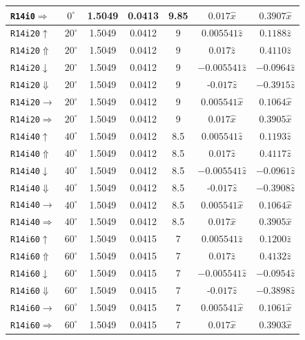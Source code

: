 \begin{longtable}{l|c|c|c|c|c|c}
{\tt R14i0$\Rightarrow$}&$0^\circ$ & 1.5049 & 0.0413 & 9.85 & $0.017\hat{x}$ & $0.3907\hat{x}$ \\
\hline
{\tt R14i20$\uparrow$}&$20^\circ$ & 1.5049 & 0.0412 & 9 & $0.005541\hat{z}$ & $0.1188\hat{z}$ \\
{\tt R14i20$\Uparrow$}&$20^\circ$ & 1.5049 & 0.0412 & 9 & $0.017\hat{z}$ & $0.4110\hat{z}$ \\
{\tt R14i20$\downarrow$}&$20^\circ$ & 1.5049 & 0.0412 & 9 &  $-0.005541\hat{z}$& $-0.0964\hat{z}$\\
{\tt R14i20$\Downarrow$}&$20^\circ$ & 1.5049 & 0.0412 & 9 & -$0.017\hat{z}$ & $-0.3915\hat{z}$ \\
{\tt R14i20$\rightarrow$}&$20^\circ$ & 1.5049 & 0.0412 & 9 & $0.005541\hat{x}$ & $0.1064\hat{x}$\\
{\tt R14i20$\Rightarrow$}&$20^\circ$ & 1.5049 & 0.0412 & 9 & $0.017\hat{x}$ & $0.3905\hat{x}$ \\
\hline
{\tt R14i40$\uparrow$}&$40^\circ$ & 1.5049 & 0.0412 & 8.5 &  $0.005541\hat{z}$ & $0.1193\hat{z}$ \\
{\tt R14i40$\Uparrow$}&$40^\circ$ & 1.5049 & 0.0412 & 8.5 & $0.017\hat{z}$ & $0.4117\hat{z}$ \\
{\tt R14i40$\downarrow$}&$40^\circ$ & 1.5049 & 0.0412 & 8.5 & $-0.005541\hat{z}$& $-0.0961\hat{z}$\\
{\tt R14i40$\Downarrow$}&$40^\circ$ & 1.5049 & 0.0412 & 8.5 & -$0.017\hat{z}$ & $-0.3908\hat{z}$ \\
{\tt R14i40$\rightarrow$}&$40^\circ$ & 1.5049 & 0.0412 & 8.5 & $0.005541\hat{x}$ & $0.1064\hat{x}$\\
{\tt R14i40$\Rightarrow$}&$40^\circ$ & 1.5049 & 0.0412 & 8.5 & $0.017\hat{x}$ & $0.3905\hat{x}$ \\
\hline
{\tt R14i60$\uparrow$}&$60^\circ$ & 1.5049 & 0.0415 & 7 &  $0.005541\hat{z}$ & $0.1200\hat{z}$ \\
{\tt R14i60$\Uparrow$}&$60^\circ$ & 1.5049 & 0.0415 & 7 & $0.017\hat{z}$ & $0.4132\hat{z}$ \\
{\tt R14i60$\downarrow$}&$60^\circ$ & 1.5049 & 0.0415 & 7 & $-0.005541\hat{z}$& $-0.0954\hat{z}$\\
{\tt R14i60$\Downarrow$}&$60^\circ$ & 1.5049 & 0.0415 & 7 & -$0.017\hat{z}$ & $-0.3898\hat{z}$ \\
{\tt R14i60$\rightarrow$}&$60^\circ$ & 1.5049 & 0.0415 & 7 & $0.005541\hat{x}$ & $0.1061\hat{x}$\\
{\tt R14i60$\Rightarrow$}&$60^\circ$ & 1.5049 & 0.0415 & 7 & $0.017\hat{x}$ & $0.3903\hat{x}$ \\

\end{longtable}
